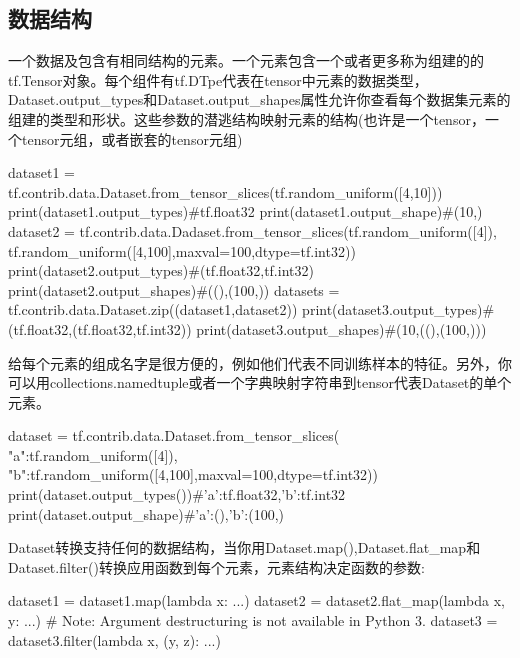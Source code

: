 \subsection{数据结构}
一个数据及包含有相同结构的元素。一个元素包含一个或者更多称为组建的的tf.Tensor对象。每个组件有tf.DTpe代表在tensor中元素的数据类型，Dataset.output\_types和Dataset.output\_shapes属性允许你查看每个数据集元素的组建的类型和形状。这些参数的潜逃结构映射元素的结构(也许是一个tensor，一个tensor元组，或者嵌套的tensor元组)
\begin{python}
dataset1 = tf.contrib.data.Dataset.from_tensor_slices(tf.random_uniform([4,10]))
print(dataset1.output_types)#tf.float32
print(dataset1.output_shape)#(10,)
dataset2 = tf.contrib.data.Dadaset.from_tensor_slices(tf.random_uniform([4]),
tf.random_uniform([4,100],maxval=100,dtype=tf.int32))
print(dataset2.output_types)#(tf.float32,tf.int32)
print(dataset2.output_shapes)#((),(100,))
datasets = tf.contrib.data.Dataset.zip((dataset1,dataset2))
print(dataset3.output_types)#(tf.float32,(tf.float32,tf.int32))
print(dataset3.output_shapes)#(10,((),(100,)))
\end{python}
给每个元素的组成名字是很方便的，例如他们代表不同训练样本的特征。另外，你可以用collections.namedtuple或者一个字典映射字符串到tensor代表Dataset的单个元素。
\begin{python}
dataset = tf.contrib.data.Dataset.from_tensor_slices(
	"a":tf.random_uniform([4]),
	"b":tf.random_uniform([4,100],maxval=100,dtype=tf.int32))
print(dataset.output_types())#{'a':tf.float32,'b':tf.int32}
print(dataset.output_shape)#{'a':(),'b':(100,)}
\end{python}
Dataset转换支持任何的数据结构，当你用Dataset.map(),Dataset.flat\_map和Dataset.filter()转换应用函数到每个元素，元素结构决定函数的参数:
\begin{python}
dataset1 = dataset1.map(lambda x: ...)
dataset2 = dataset2.flat_map(lambda x, y: ...)
# Note: Argument destructuring is not available in Python 3.
dataset3 = dataset3.filter(lambda x, (y, z): ...)
\end{python}

